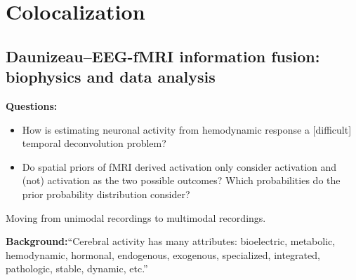 \documentclass{article}
\begin{document}
{    \section{Colocalization} 
        \subsection{Daunizeau--EEG-fMRI information fusion: biophysics and data 
    analysis}
            \textbf{Questions:}
            \begin{itemize}
                \item How is estimating neuronal activity from hemodynamic
response a [difficult] temporal deconvolution problem?
                \item Do spatial priors of fMRI derived activation only consider
activation and (not) activation as the two possible outcomes? Which
probabilities do the prior probability distribution consider?
            \end{itemize}     
            Moving from unimodal recordings to multimodal recordings. 

            \textbf{Background:}``Cerebral activity has many attributes: bioelectric,
            metabolic, hemodynamic, hormonal, endogenous, exogenous, specialized, 
    integrated,
            pathologic, stable, dynamic, etc.'' 

}
\end{document}
